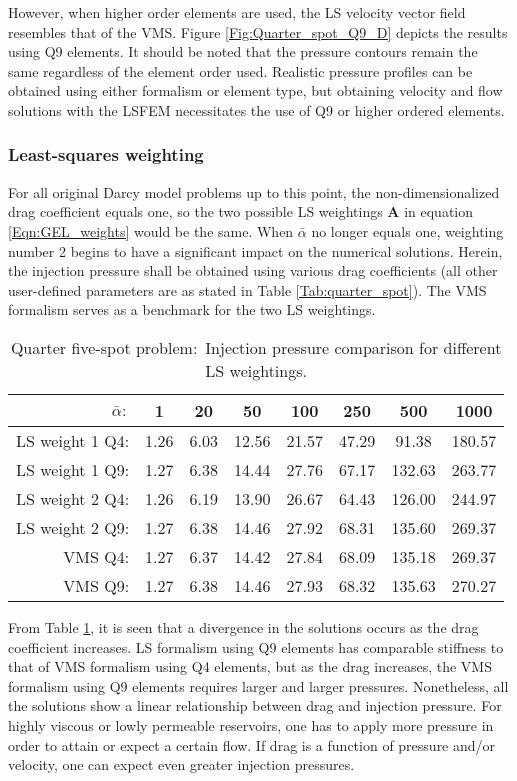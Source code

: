 \documentclass[11pt,reqno]{amsart}
\begin{document}
However, when higher order elements are used, the LS velocity vector field resembles 
that of the VMS. Figure \ref{Fig:Quarter_spot_Q9_D} depicts the results
using Q9 elements. It should be noted that the pressure contours remain the same 
regardless of the element order used. Realistic pressure profiles can be 
obtained using either formalism or element type, but obtaining velocity and flow 
solutions with the LSFEM necessitates the use of Q9 or higher ordered elements.

\subsubsection{Least-squares weighting}
For all original Darcy model problems up to this point, the non-dimensionalized drag 
coefficient equals one, so the two possible LS weightings $\mathbf{A}$ in equation 
\eqref{Eqn:GEL_weights} would be the same. When $\bar{\alpha}$ 
no longer equals one, weighting number 2 begins to have a significant impact on the 
numerical solutions. Herein, the injection pressure shall be obtained using various 
drag coefficients (all other user-defined parameters are as stated in Table 
\ref{Tab:quarter_spot}). The VMS formalism serves as a benchmark for the two LS 
weightings.
\begin{table}[t!]
  \centering
  \caption{Quarter five-spot problem:~Injection pressure comparison for different LS weightings.}
  \begin{tabular}{rccccccc}
      \hline
      $\bar{\alpha}:$ & 1 & 20 & 50 & 100 & 250 & 500 & 1000\\
      \hline
      LS weight 1 Q4: & 1.26 & 6.03 & 12.56 & 21.57 & 47.29 & 91.38 & 180.57 \\
      LS weight 1 Q9: & 1.27 & 6.38 & 14.44 & 27.76 & 67.17 & 132.63 & 263.77 \\
      LS weight 2 Q4: & 1.26 & 6.19 & 13.90 & 26.67 & 64.43 & 126.00 & 244.97 \\
      LS weight 2 Q9: & 1.27 & 6.38 & 14.46 & 27.92 & 68.31 & 135.60 & 269.37 \\
      VMS Q4: & 1.27 & 6.37 & 14.42 & 27.84 & 68.09 & 135.18 & 269.37 \\
      VMS Q9: & 1.27 & 6.38 & 14.46 & 27.93 & 68.32 & 135.63 & 270.27 \\
      \hline
  \end{tabular}
  \label{Tab:five_spot_weighting_compare}
\end{table}
From Table \ref{Tab:five_spot_weighting_compare}, it is seen that a divergence in the 
solutions occurs as the drag coefficient increases. LS formalism using Q9 elements has 
comparable stiffness to that of VMS formalism using Q4 elements, but as the drag 
increases, the VMS formalism using Q9 elements requires larger and larger pressures. 
Nonetheless, all the solutions show a linear relationship between drag and injection 
pressure. For highly viscous or lowly permeable reservoirs, one has to apply more pressure 
in order to attain or expect a certain flow. If drag is a function of pressure and/or 
velocity, one can expect even greater injection pressures.
\end{document}
